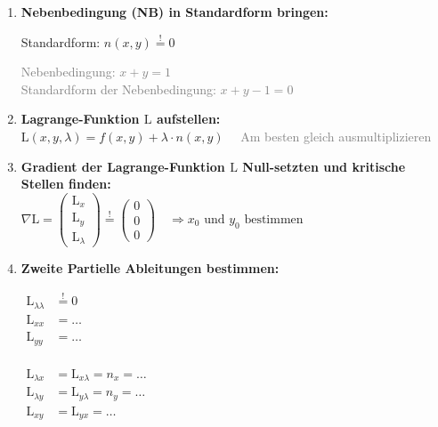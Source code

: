 \begin{enumerate}[itemsep=1ex]
    \item \textbf{Nebenbedingung (NB) in Standardform bringen:}\\
    \begin{minipage}[t]{0.4\linewidth}
        Standardform: $n(x, y) \stackrel{!}{=} 0$
    \end{minipage}\hfill
    \begin{minipage}[t]{0.58\linewidth}
            \textcolor{gray}{Nebenbedingung: $x + y = 1$}\\
            \textcolor{gray}{Standardform der Nebenbedingung: $x + y - 1 = 0$}
    \end{minipage}


    \item \textbf{Lagrange-Funktion $\mathrm{L}$ aufstellen:}\\
    $\mathrm{L}(x, y, \lambda) =
    f(x, y) + \lambda \cdot n(x, y) \,\,\,\,\,\,$ \textcolor{gray}{Am besten gleich ausmultiplizieren}
    

    \item \textbf{Gradient der Lagrange-Funktion $\mathrm{L}$ Null-setzten und kritische Stellen finden:}\\
    $\nabla \mathrm{L}=
    \begin{pmatrix}
        \mathrm{L}_x\\
        \mathrm{L}_y\\
        \mathrm{L}_\lambda
    \end{pmatrix} \stackrel{!}{=}
    \begin{pmatrix}
        0\\
        0\\
        0
    \end{pmatrix}
    \, \, \, \, \, \,
    \Rightarrow 
    x_0 \text{ und } y_0 \text{ bestimmen}$
    \hfill

    \item \textbf{Zweite Partielle Ableitungen bestimmen:}\\
    \begin{minipage}[t]{0.4\linewidth}
        $\begin{aligned}
            \mathrm{L}_{\lambda \lambda} &\stackrel{!}{=} 0\\
            \mathrm{L}_{xx} &= \dots\\
            \mathrm{L}_{yy} &= \dots\\
        \end{aligned}$
    \end{minipage}\hfill
    \begin{minipage}[c]{0.58\linewidth}
        $\begin{aligned}
            \mathrm{L}_{\lambda x} &= \mathrm{L}_{x\lambda} = n_x = \dots\\
            \mathrm{L}_{\lambda y} &= \mathrm{L}_{y\lambda} = n_y =\dots\\
            \mathrm{L}_{xy} &= \mathrm{L}_{yx} = \dots\\
        \end{aligned}$
    \end{minipage}



\end{enumerate}
